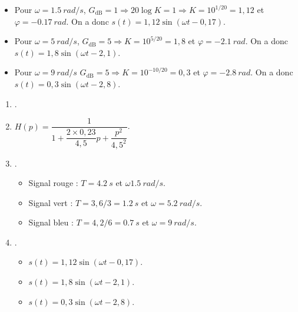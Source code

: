 \begin{corrigebox}
\begin{itemize}
\item Pour  $\omega = \SI{1,5}{rad/s}$, $G_{\text{dB}}=1 \Rightarrow 20\log K = 1 \Rightarrow  K = 10^{1/20} = 1,12$ et $\varphi =  -\SI{0,17}{rad}$. On a donc $s(t)=1,12\sin\left(\omega t - 0,17\right)$.
\item Pour  $\omega = \SI{5}{rad/s}$, $G_{\text{dB}}=5 \Rightarrow  K = 10^{5/20} = 1,8$ et $\varphi =  -\SI{2,1}{rad}$. On a donc $s(t)=1,8\sin\left(\omega t - 2,1\right)$.
\item Pour  $\omega = \SI{9}{rad/s}$ $G_{\text{dB}}=5 \Rightarrow  K = 10^{-10/20} = 0,3$ et 
$\varphi =  -\SI{2,8}{rad}$. On a donc $s(t)=0,3\sin\left(\omega t - 2,8\right)$.
\end{itemize}

\begin{enumerate}
\item .
\item $H(p)=\dfrac{1}{1+\dfrac{2\times 0,23}{4,5}p+\dfrac{p^2}{4,5^2}}$.
\item .
\begin{itemize}
\item Signal rouge : $T=\SI{4,2}{s}$ et $\omega \SI{1,5}{rad/s}$.
\item Signal vert : $T=3,6/3 = \SI{1,2}{s}$ et $\omega= \SI{5,2}{rad/s}$.
\item Signal bleu : $T=4,2/6 = \SI{0,7}{s}$  et $\omega= \SI{9}{rad/s}$.
\end{itemize}
\item .
\begin{itemize}
\item $s(t)=1,12\sin\left(\omega t - 0,17\right)$.
\item $s(t)=1,8\sin\left(\omega t - 2,1\right)$.
\item $s(t)=0,3\sin\left(\omega t - 2,8\right)$.
\end{itemize}
\end{enumerate}
\end{corrigebox}
